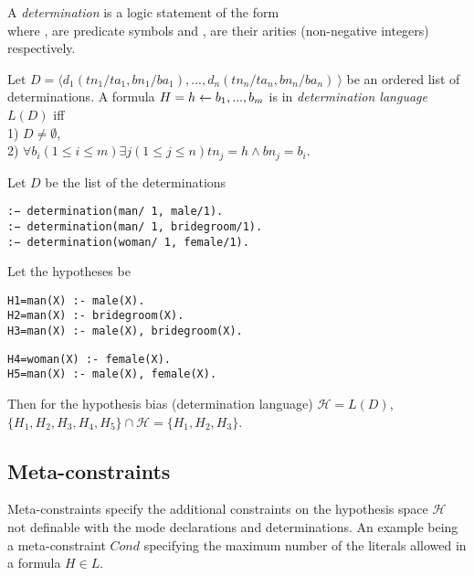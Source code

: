 \begin{defn}\cite{aleph2007}
A \emph{determination} is a logic statement of the form\\
where ,  are predicate symbols and
,  are their arities (non-negative integers) respectively.
\end{defn}

\begin{defn}\label{definition_determination_language}
Let $D=\langle d_1(tn_1/ta_1, bn_1/ba_1), ..., d_n(tn_n/ta_n, bn_n/ba_n)\ \rangle$ be an ordered list of determinations. A formula $H=h \leftarrow b_1, ..., b_m$ is in \emph{determination language} $L(D)$ iff\\
1) $D \not=\emptyset$,\\
2) $\forall b_i (1 \le i \le m) \exists j (1 \le j \le n) tn_j=h \land bn_j=b_i$.
\end{defn}

\begin{exmp}
Let $D$ be the list of the determinations
\begin{lstlisting}
:− determination(man/ 1, male/1).
:− determination(man/ 1, bridegroom/1).
:− determination(woman/ 1, female/1).
\end{lstlisting}
Let the hypotheses be

\begin{minipage}[t]{.50\textwidth}
\begin{lstlisting}
H1=man(X) :- male(X).
H2=man(X) :- bridegroom(X).
H3=man(X) :- male(X), bridegroom(X).
\end{lstlisting}
\end{minipage}
\begin{minipage}[t]{.50\textwidth}
\begin{lstlisting}
H4=woman(X) :- female(X).
H5=man(X) :- male(X), female(X).
\end{lstlisting}
\end{minipage}

Then for the hypothesis bias (determination language) $\mathcal{H}=L(D)$,
$\{H_1, H_2, H_3, H_4, H_5\} \cap \mathcal{H}=\{H_1, H_2, H_3\}$.
\end{exmp}

\subsection{Meta-constraints}\label{bias_meta-constraints}
Meta-constraints specify the additional constraints on the hypothesis space $\mathcal{H}$ not definable with the mode declarations and determinations.
An example being a meta-constraint $Cond$ specifying the maximum number of the literals allowed in a formula $H \in L$.

